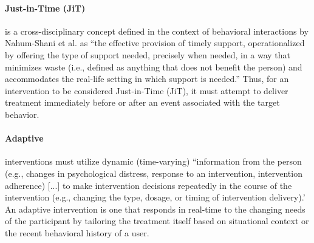 \documentclass[runningheads,a4paper]{llncs}
\begin{document}
\paragraph{Just-in-Time (JiT)} is a cross-disciplinary concept defined in the context of behavioral interactions by Nahum-Shani et al. as ``the effective provision of timely support, operationalized by offering the type of support needed, precisely when needed, in a way that minimizes waste (i.e., defined as anything that does not benefit the person) and accommodates the real-life setting in which support is needed.'' \cite{nahum2014}
Thus, for an intervention to be considered Just-in-Time (JiT), it must attempt to deliver treatment immediately before or after an event associated with the target behavior. 

\paragraph{Adaptive} interventions must utilize dynamic (time-varying) ``information from the person (e.g., changes in psychological distress, response to an intervention, intervention adherence) [...] to make intervention decisions repeatedly in the course of the intervention (e.g., changing the type, dosage, or timing of intervention delivery).' \cite{nahum2014}
An adaptive intervention is one that responds in real-time to the changing needs of the participant by tailoring the treatment itself based on situational context or the recent behavioral history of a user. 
\end{document}
